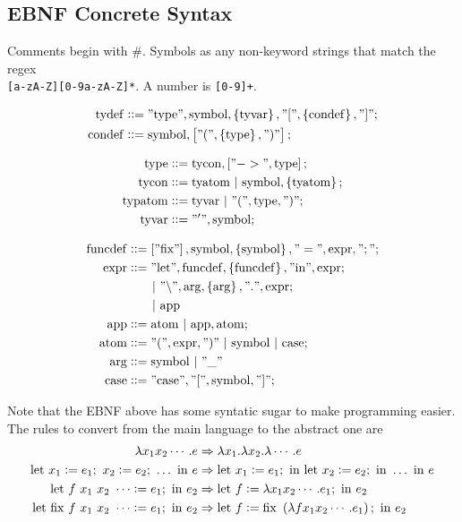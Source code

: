 \documentclass[12pt]{article}
\newcommand{\beq}{::=}
\newcommand{\bs}[1]{\mathrm{#1}}
\newcommand{\bstr}[1]{\mathrm{"#1"}}
\begin{document}
\subsection{EBNF Concrete Syntax}
\label{sec:concrete_syntax}

Comments begin with \#.
Symbols as any non-keyword strings that match the regex\\
\verb~[a-zA-Z][0-9a-zA-Z]*~.
A number is \verb~[0-9]+~.

\begin{align}
  \bs{tydef} &\beq \bstr{type}, \bs{symbol}, \cbr{\bs{tyvar}},
               \bstr{[}, \cbr{\bs{condef}}, \bstr{]} ;\\
  \bs{condef} &\beq \bs{symbol}, \sbr{\bstr{(}, \cbr{\bs{type}}, \bstr{)}} ;
\end{align}

\begin{align}
  \bs{type} &\beq \bs{tycon}, \sbr{\bstr{->}, \bs{type}} ;\\
  \bs{tycon} &\beq \bs{tyatom} ~|~ \bs{symbol}, \cbr{\bs{tyatom}} ;\\
  \bs{typatom} &\beq \bs{tyvar} ~|~ \bstr{(}, \bs{type}, \bstr{)} ;\\
  \bs{tyvar} &\beq \bstr{'}, \bs{symbol} ;
\end{align}

\begin{align}
  \bs{funcdef} &\beq \sbr{\bstr{fix}}, \bs{symbol}, \cbr{\bs{symbol}}, \bstr{=}, \bs{expr}, \bstr{;} ;\\
  \bs{expr} &\beq \bstr{let}, \bs{funcdef}, \cbr{\bs{funcdef}}, \bstr{in}, \bs{expr} ;\\
              &\qquad|~ \bstr{\backslash}, \bs{arg}, \cbr{\bs{arg}}, \bstr{.}, \bs{expr} ;\\
                 &\qquad|~ \bs{app}\\
  \bs{app} &\beq \bs{atom} ~|~ \bs{app}, \bs{atom} ;\\
  \bs{atom} &\beq \bstr{(}, \bs{expr}, \bstr{)} ~|~ \bs{symbol} ~|~ \bs{case} ;\\
  \bs{arg} &\beq \bs{symbol} ~|~ \bstr{\_}\\
  \bs{case} &\beq \bstr{case}, \bstr{[}, \bs{symbol}, \bstr{]} ;
\end{align}

Note that the EBNF above has some syntatic sugar to make programming
easier.
The rules to convert from the main language to the abstract one are
\begin{align}
  \lambda x_1 x_2 \cdots. e
  &\Rightarrow \lambda x_1. \lambda x_2. \lambda \cdots. e\\
  \mathrm{let}~x_1 := e_1;~x_2 := e_2;~\ldots~\mathrm{in}~e
  &\Rightarrow \mathrm{let}~x_1 := e_1;~\mathrm{in}~\mathrm{let}~x_2 := e_2;~\mathrm{in}~\ldots~\mathrm{in}~e\\
  \mathrm{let}~f~x_1~x_2~\cdots := e_1;~\mathrm{in}~e_2
  &\Rightarrow \mathrm{let}~f := \lambda x_1 x_2 \cdots. e_1;~\mathrm{in}~e_2\\
  \mathrm{let}~\mathrm{fix}~f~x_1~x_2~\cdots := e_1;~\mathrm{in}~e_2
  &\Rightarrow \mathrm{let}~f := \mathrm{fix}~\del{\lambda f x_1 x_2 \cdots. e_1};~\mathrm{in}~e_2
\end{align}
\end{document}
